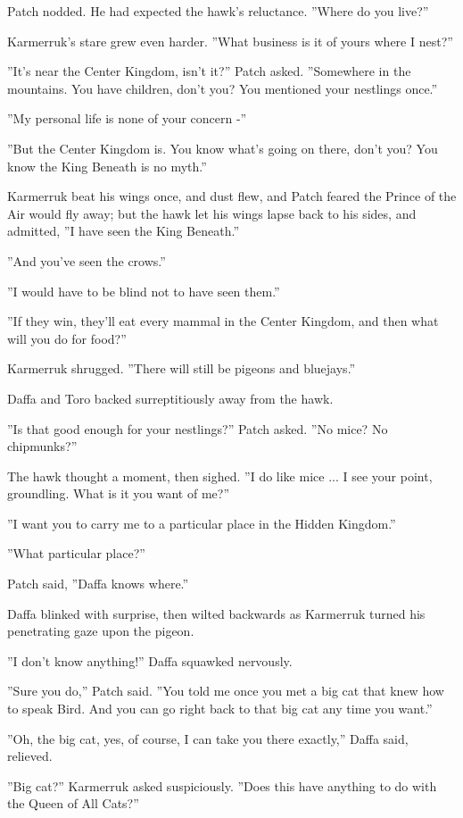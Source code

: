 \documentclass[12pt]{book}
\begin{document}
Patch nodded. He had expected the hawk's reluctance. ''Where do you live?''

Karmerruk's stare grew even harder. ''What business is it of yours where I nest?''

''It's near the Center Kingdom, isn't it?'' Patch asked. ''Somewhere in the mountains. You have children, don't you? You mentioned your nestlings once.''

''My personal life is none of your concern -''

''But the Center Kingdom is. You know what's going on there, don't you? You know the King Beneath is no myth.''

Karmerruk beat his wings once, and dust flew, and Patch feared the Prince of the Air would fly away; but the hawk let his wings lapse back to his sides, and admitted, ''I have seen the King Beneath.''

''And you've seen the crows.''

''I would have to be blind not to have seen them.''

''If they win, they'll eat every mammal in the Center Kingdom, and then what will you do for food?''

Karmerruk shrugged. ''There will still be pigeons and bluejays.''

Daffa and Toro backed surreptitiously away from the hawk.

''Is that good enough for your nestlings?'' Patch asked. ''No mice? No chipmunks?''

The hawk thought a moment, then sighed. ''I do like mice ... I see your point, groundling. What is it you want of me?''

''I want you to carry me to a particular place in the Hidden Kingdom.''

''What particular place?''

Patch said, ''Daffa knows where.''

Daffa blinked with surprise, then wilted backwards as Karmerruk turned his penetrating gaze upon the pigeon.

''I don't know anything!'' Daffa squawked nervously.

''Sure you do,'' Patch said. ''You told me once you met a big cat that knew how to speak Bird. And you can go right back to that big cat any time you want.''

''Oh, the big cat, yes, of course, I can take you there exactly,'' Daffa said, relieved.

''Big cat?'' Karmerruk asked suspiciously. ''Does this have anything to do with the Queen of All Cats?''
\end{document}
